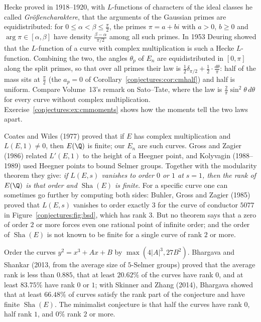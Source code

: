 \begin{remark}\label{conjectures:rem:hecke}
Hecke proved in 1918--1920, with $L$-functions of characters of the ideal classes he called \emph{Gr\"o\ss encharaktere}, that the arguments of the Gaussian
primes are equidistributed: for $0\le\alpha<\beta\le\frac\pi2$, the primes $\pi=a+bi$ with $a>0$, $b\ge0$ and $\arg\pi\in[\alpha,\beta]$ have density
$\frac{\beta-\alpha}{\pi/2}$ among all such primes. In 1953 Deuring showed that the $L$-function of a curve with complex multiplication is such a Hecke
$L$-function. Combining the two, the angles $\theta_p$ of $E_n$ are equidistributed in $[0,\pi]$ along the split primes, so that over all primes their law is
$\frac12\delta_{\pi/2}+\frac12\cdot\frac{d\theta}\pi$: half of the mass sits at $\frac\pi2$ (the $a_p=0$ of Corollary~\ref{conjectures:cor:cmhalf}) and half is uniform.
Compare Volume~13's remark on Sato--Tate, where the law is $\frac2\pi\sin^2\theta\,d\theta$ for every curve without complex multiplication.
Exercise~\ref{conjectures:ex:cmmoments} shows how the moments tell the two laws apart.
\end{remark}

\begin{remark}\label{conjectures:rem:bsdproved}
Coates and Wiles (1977) proved that if $E$ has complex multiplication and $L(E,1)\ne0$, then $E(\Q)$ is finite; our $E_n$ are such curves. Gross and Zagier
(1986) related $L'(E,1)$ to the height of a Heegner point, and Kolyvagin (1988--1989) used Heegner points to bound Selmer groups. Together with the modularity
theorem they give: \emph{if $L(E,s)$ vanishes to order $0$ or $1$ at $s=1$, then the rank of $E(\Q)$ is that order and $\operatorname{Sha}(E)$ is finite}. For a specific curve
one can sometimes go further by computing both sides: Buhler, Gross and Zagier (1985) proved that $L(E,s)$ vanishes to order exactly $3$ for the curve of
conductor $5077$ in Figure~\ref{conjectures:fig:bsd}, which has rank $3$. But no theorem says that a zero of order $2$ or more forces even one rational point of
infinite order; and the order of $\operatorname{Sha}(E)$ is not known to be finite for a single curve of rank $2$ or more.
\end{remark}

\begin{remark}[on average]\label{conjectures:rem:averages}
Order the curves $y^2=x^3+Ax+B$ by $\max(4|A|^3,27B^2)$. Bhargava and Shankar (2013, from the average size of $5$-Selmer groups) proved that the average rank
is less than $0.885$, that at least $20.62\%$ of the curves have rank $0$, and at least $83.75\%$ have rank $0$ or $1$; with Skinner and Zhang (2014), Bhargava
showed that at least $66.48\%$ of curves satisfy the rank part of the conjecture and have finite $\operatorname{Sha}(E)$. The minimalist conjecture is that half the curves have
rank $0$, half rank $1$, and $0\%$ rank $2$ or more.
\end{remark}

